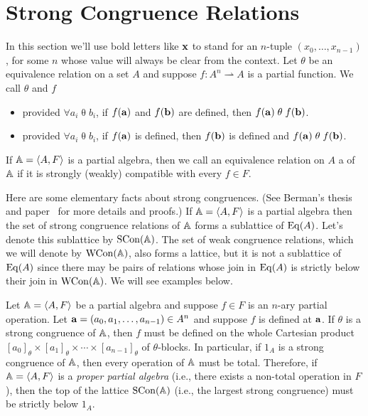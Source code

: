 \section{Strong Congruence Relations}
In this section we'll use bold letters like $\mathbf{x}$ to stand for an $n$-tuple $(x_0, \dots, x_{n-1})$,
for some $n$ whose value will always be clear from the context.
Let $\theta$ be an equivalence relation on a set $A$ and suppose
$f\colon A^n \rightharpoonup A$ is a partial function.
We call $\theta$ and $f$
\begin{itemize}
\item {} provided $\forall a_i \mathrel{\theta} b_i$,
if $f(\mathbf{a})$ and $f(\mathbf{b})$ are defined, then $f(\mathbf{a}) \mathrel{\theta} f(\mathbf{b})$.
\item {} provided $\forall a_i \mathrel{\theta} b_i$,
if $f(\mathbf{a})$ is defined, then $f(\mathbf{b})$ is defined and $f(\mathbf{a}) \mathrel{\theta} f(\mathbf{b})$.
\end{itemize}

If $\mathbb{A} = \langle A, F\rangle$ is a partial algebra, then we call an equivalence relation
on $A$ a  of $\mathbb{A}$ if it is 
strongly (weakly) compatible with every $f\in F$.

Here are some elementary facts about strong congruences.
(See Berman's thesis~\cite{MR2619731} and paper~\cite{MR0308011} for more details and proofs.)
If $\mathbb{A} = \langle A, F\rangle$ is a partial algebra then the set of strong congruence relations of $\mathbb{A}$
forms a sublattice of $\operatorname{Eq}(A)$. Let's denote this sublattice by $\operatorname{SCon}(\mathbb{A})$.
The set of weak congruence relations, which we will denote by $\operatorname{WCon}(\mathbb{A})$,
also forms a lattice, but it is not a sublattice of $\operatorname{Eq}(A)$
since there may be pairs of relations whose join in $\operatorname{Eq}(A)$ is strictly below
their join in $\operatorname{WCon}(\mathbb{A})$. We will see examples below.

Let $\mathbb{A} = \langle A, F\rangle$ be a partial algebra and suppose $f \in F$ is an $n$-ary partial operation.
Let $\mathbf{a} = (a_0, a_1, \dots, a_{n-1})\in A^n$ and suppose $f$ is defined at $\mathbf{a}$.
If $\theta$ is a strong congruence of $\mathbb{A}$, then $f$ must be defined on 
the whole Cartesian product 
$[a_0]_\theta \times [a_1]_\theta \times \cdots \times [a_{n-1}]_\theta$ of $\theta$-blocks.
In particular, if $1_A$ is a strong congruence of $\mathbb{A}$, then every operation of
$\mathbb{A}$ must be total.
Therefore, if $\mathbb{A} = \langle A, F\rangle$ is a \emph{proper partial algebra}
(i.e., there exists a non-total operation in $F$), then
the top of the lattice $\operatorname{SCon}(\mathbb{A})$ (i.e., the largest strong congruence)
must be strictly below $1_A$.

